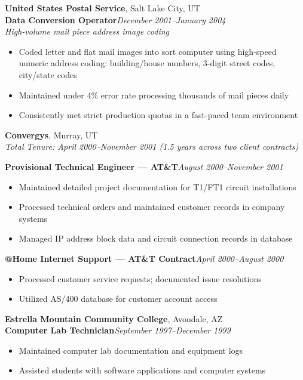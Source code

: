 \documentclass[9pt,letterpaper]{extarticle}
\begin{document}
\vspace{5pt}
\noindent\textbf{United States Postal Service}, Salt Lake City, UT\\
\textbf{Data Conversion Operator}\hfill\textit{December 2001--January 2004}\\
\textit{High-volume mail piece address image coding}
\begin{itemize}
  \item Coded letter and flat mail images into sort computer using high-speed numeric address coding: building/house numbers, 3-digit street codes, city/state codes
  \item Maintained under 4\% error rate processing thousands of mail pieces daily
  \item Consistently met strict production quotas in a fast-paced team environment
\end{itemize}

\vspace{5pt}
\noindent\textbf{Convergys}, Murray, UT\\
\textit{Total Tenure: April 2000--November 2001 (1.5 years across two client contracts)}

\smallskip
{}
\noindent\textbf{Provisional Technical Engineer --- AT\&T}\hfill\textit{August 2000--November 2001}
\begin{itemize}
  \item Maintained detailed project documentation for T1/FT1 circuit installations
  \item Processed technical orders and maintained customer records in company systems
  \item Managed IP address block data and circuit connection records in database
\end{itemize}

\noindent\textbf{@Home Internet Support --- AT\&T Contract}\hfill\textit{April 2000--August 2000}
\begin{itemize}
  \item Processed customer service requests; documented issue resolutions
  \item Utilized AS/400 database for customer account access
\end{itemize}

\vspace{5pt}
\noindent\textbf{Estrella Mountain Community College}, Avondale, AZ\\
\textbf{Computer Lab Technician}\hfill\textit{September 1997--December 1999}
\begin{itemize}
  \item Maintained computer lab documentation and equipment logs
  \item Assisted students with software applications and computer systems
\end{itemize}
\end{document}
